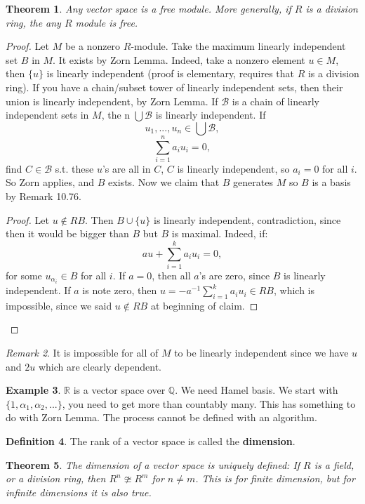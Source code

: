 \documentclass[9pt,reqno,twoside]{amsbook}
\theoremstyle{plain}
\newtheorem{theorem}{Theorem}[chapter]
\numberwithin{section}{chapter}
\numberwithin{equation}{chapter}
\theoremstyle{definition}
\newtheorem{Def}[theorem]{Definition}
\newtheorem{Ex}[theorem]{Example}
\theoremstyle{remark}
\newtheorem{rem}[theorem]{Remark}
\theoremstyle{plain}
\newcommand{\R}{\mathbb{R}}
\begin{document}
\begin{theorem}
Any vector space is a free module. More generally, if $R$ is a division ring, the any $R$ module is free. 
\end{theorem}
\begin{proof}
Let $M$ be a nonzero $R$-module.
Take the maximum linearly independent set $B$ in $M$. It exists by Zorn Lemma. Indeed, take a nonzero element $u \in M$, then $\{u\}$ is linearly independent (proof is elementary, requires that $R$ is a division ring). If you have a chain/subset tower of linearly independent sets, then their union is linearly independent, by Zorn Lemma. If $\mathcal{B}$ is a chain of linearly independent sets in $M$, the n $\bigcup \mathcal{B}$ is linearly independent. If 
$$
u_1,...,u_n \in \bigcup \mathcal{B},
$$
$$
\sum_{i  = 1}^na_i u_i = 0,
$$
 find $C \in \mathcal{B}$ s.t. these $u$'s are all in $C$, $C$ is linearly independent, so $a_i = 0$ for all $i$. So Zorn applies, and $B$ exists. Now we claim that $B$ generates $M$ so $B$ is a basis by Remark 10.76. 
 \begin{proof}
 Let $u \notin RB$. Then $B\cup \{u\}$ is linearly independent, contradiction, since then it would be bigger than $B$ but $B$ is maximal. 
 Indeed, if: 
 $$
 au + \sum_{i  = 1}^k a_i u_i = 0,
 $$
  for some $u_{\alpha_i} \in B$ for all $i$. If $a = 0$, then all $a$'s are zero, since $B$ is linearly independent. If $a$ is note zero, then $u = -a^{-1}\sum_{i  = 1}^k a_i u_i\in RB$, which is impossible, since we said $u \notin RB$ at beginning of claim. 
   \end{proof}
\end{proof}

\begin{rem}
It is impossible for all of $M$ to be linearly independent since we have $u$ and $2u$ which are clearly dependent. 
\end{rem}

\begin{Ex}
$\R$ is a vector space over $\mathbb{Q}$. We need Hamel basis. We start with $\{1,\alpha_1,\alpha_2,...\}$, you need to get more than countably many. This has something to do with Zorn Lemma. The process cannot be defined with an algorithm. 
\end{Ex}

\begin{Def}
The rank of a vector space is called the \textbf{dimension}. 
\end{Def}

\begin{theorem}
The dimension of a vector space is uniquely defined: If $R$ is a field, or a division ring, then $R^n \ncong R^m$ for $n \neq m$. This is for finite  dimension, but for infinite dimensions it is also true. 
\end{theorem}
\end{document}
